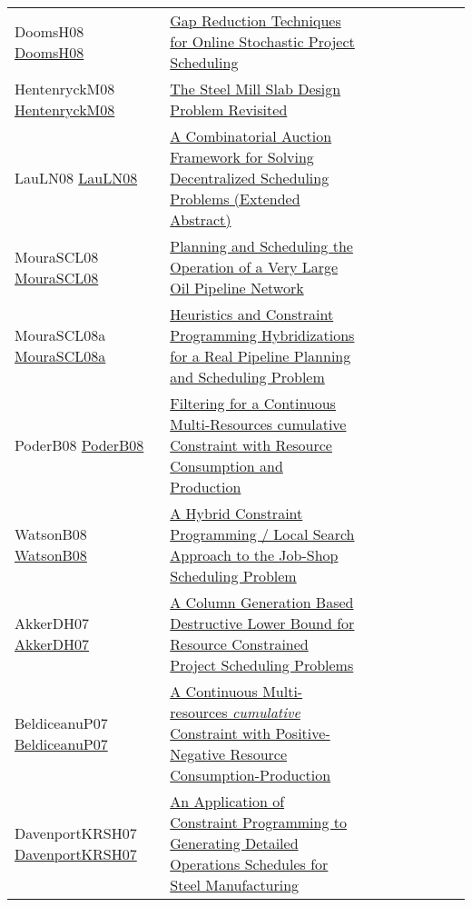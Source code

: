 {\begin{longtable}{p{3cm}p{7cm}lllllll}
DoomsH08 \href{https://doi.org/10.1007/978-3-540-68155-7\_8}{DoomsH08} &  \href{papers/DoomsH08.pdf}{Gap Reduction Techniques for Online Stochastic Project Scheduling} &  &  &  &  &  &  & \\
HentenryckM08 \href{https://doi.org/10.1007/978-3-540-68155-7\_41}{HentenryckM08} &  \href{papers/HentenryckM08.pdf}{The Steel Mill Slab Design Problem Revisited} &  &  &  &  &  &  & \\
LauLN08 \href{https://doi.org/10.1007/978-3-540-68155-7\_33}{LauLN08} &  \href{papers/LauLN08.pdf}{A Combinatorial Auction Framework for Solving Decentralized Scheduling Problems (Extended Abstract)} &  &  &  &  &  &  & \\
MouraSCL08 \href{https://doi.org/10.1007/978-3-540-85958-1\_3}{MouraSCL08} &  \href{papers/MouraSCL08.pdf}{Planning and Scheduling the Operation of a Very Large Oil Pipeline Network} &  &  &  &  &  &  & \\
MouraSCL08a \href{https://doi.org/10.1109/CSE.2008.24}{MouraSCL08a} &  \href{papers/MouraSCL08a.pdf}{Heuristics and Constraint Programming Hybridizations for a Real Pipeline Planning and Scheduling Problem} &  &  &  &  &  &  & \\
PoderB08 \href{http://www.aaai.org/Library/ICAPS/2008/icaps08-033.php}{PoderB08} &  \href{}{Filtering for a Continuous Multi-Resources cumulative Constraint with Resource Consumption and Production} &  &  &  &  &  &  & \\
WatsonB08 \href{https://doi.org/10.1007/978-3-540-68155-7\_21}{WatsonB08} &  \href{papers/WatsonB08.pdf}{A Hybrid Constraint Programming / Local Search Approach to the Job-Shop Scheduling Problem} &  &  &  &  &  &  & \\
AkkerDH07 \href{https://doi.org/10.1007/978-3-540-72397-4\_27}{AkkerDH07} &  \href{papers/AkkerDH07.pdf}{A Column Generation Based Destructive Lower Bound for Resource Constrained Project Scheduling Problems} &  &  &  &  &  &  & \\
BeldiceanuP07 \href{https://doi.org/10.1007/978-3-540-72397-4\_16}{BeldiceanuP07} &  \href{papers/BeldiceanuP07.pdf}{A Continuous Multi-resources \emph{cumulative} Constraint with Positive-Negative Resource Consumption-Production} &  &  &  &  &  &  & \\
DavenportKRSH07 \href{https://doi.org/10.1007/978-3-540-74970-7\_7}{DavenportKRSH07} &  \href{papers/DavenportKRSH07.pdf}{An Application of Constraint Programming to Generating Detailed Operations Schedules for Steel Manufacturing} &  &  &  &  &  &  & \\

\end{longtable}}
